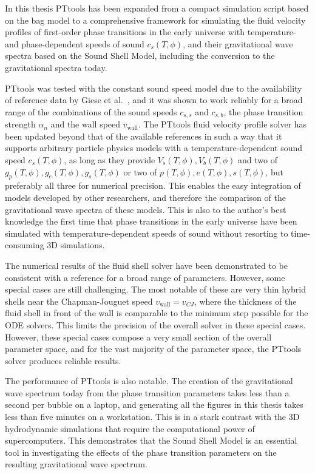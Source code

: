 In this thesis PTtools has been expanded from a compact simulation script based on the bag model
to a comprehensive framework for simulating the fluid velocity profiles of first-order phase transitions in the early universe
with temperature- and phase-dependent speeds of sound $c_s(T,\phi)$,
and their gravitational wave spectra based on the Sound Shell Model,
including the conversion to the gravitational spectra today.

PTtools was tested with the constant sound speed model due to the availability of reference data by Giese et al.~\cite{giese_2021},
and it was shown to work reliably for a broad range of the combinations of the sound speeds $c_{s,s}$ and $c_{s,b}$, the phase transition strength $\alpha_n$ and the wall speed $v_\text{wall}$.
The PTtools fluid velocity profile solver has been updated beyond that of the available references in such a way
that it supports arbitrary particle physics models with a temperature-dependent sound speed $c_s(T,\phi)$,
as long as they provide $V_s(T,\phi), V_b(T,\phi)$ and two of $g_p(T,\phi), g_e(T,\phi), g_s(T,\phi)$ or two of $p(T,\phi), e(T,\phi), s(T,\phi)$, but preferably all three for numerical precision.
This enables the easy integration of models developed by other researchers,
and therefore the comparison of the gravitational wave spectra of these models.
This is also to the author's best knowledge the first time
that phase transitions in the early universe have been simulated with temperature-dependent speeds of sound
without resorting to time-consuming 3D simulations.

The numerical results of the fluid shell solver have been demonstrated to be consistent with a reference
for a broad range of parameters.
However, some special cases are still challenging.
The most notable of these are very thin hybrid shells near the Chapman-Jouguet speed $v_\text{wall} = v_{CJ}$,
where the thickness of the fluid shell in front of the wall is comparable to the minimum step possible for the ODE solvers.
This limits the precision of the overall solver in these special cases.
However, these special cases compose a very small section of the overall parameter space,
and for the vast majority of the parameter space,
the PTtools solver produces reliable results.

The performance of PTtools is also notable.
The creation of the gravitational wave spectrum today from the phase transition parameters takes less than a second per bubble on a laptop,
and generating all the figures in this thesis takes less than five minutes on a workstation.
This is in a stark contrast with the 3D hydrodynamic simulations that require the computational power of supercomputers.
This demonstrates that the Sound Shell Model is an essential tool in investigating
the effects of the phase transition parameters on the resulting gravitational wave spectrum.


